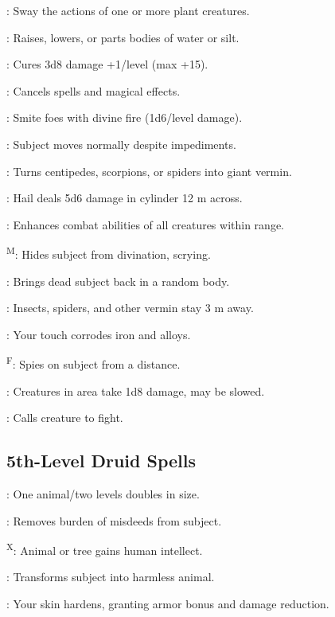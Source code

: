 : Sway the actions of one or more plant creatures.

: Raises, lowers, or parts bodies of water or silt.

: Cures 3d8 damage +1/level (max +15).

: Cancels spells and magical effects.

: Smite foes with divine fire (1d6/level damage).

: Subject moves normally despite impediments.

: Turns centipedes, scorpions, or spiders into giant vermin.

: Hail deals 5d6 damage in cylinder 12 m across.

: Enhances combat abilities of all creatures within range. %

\textsuperscript{M}: Hides subject from divination, scrying.

: Brings dead subject back in a random body.

: Insects, spiders, and other vermin stay 3 m away.

: Your touch corrodes iron and alloys.

\textsuperscript{F}: Spies on subject from a distance.

: Creatures in area take 1d8 damage, may be slowed.

: Calls creature to fight.



\subsection{5th-Level Druid Spells}

: One animal/two levels doubles in size.

: Removes burden of misdeeds from subject.

\textsuperscript{X}: Animal or tree gains human intellect.

: Transforms subject into harmless animal.

: Your skin hardens, granting armor bonus and damage reduction. %

